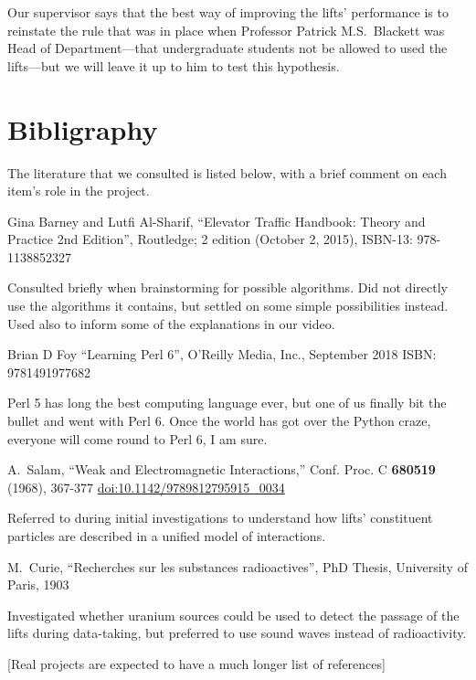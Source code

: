 \documentclass[12pt,a4paper,onecolumn]{Imperial_lab_report}
\begin{document}
Our supervisor says that the best way of improving the lifts' performance is to reinstate the rule that was in place when Professor Patrick M.S.~Blackett was Head of Department—that undergraduate students not be allowed to used the lifts—but we will leave it up to him to test this hypothesis.

\section{Bibligraphy} 
The literature that we consulted is listed below, with a brief comment on each item's role in the project.
\begin{thebibliography}{}

	Gina Barney and Lutfi Al-Sharif, ``Elevator Traffic Handbook: Theory and Practice 2nd Edition'',  Routledge; 2 edition (October 2, 2015), ISBN-13: 978-1138852327

Consulted briefly when brainstorming for possible algorithms. Did not directly use the algorithms it contains, but settled on some simple possibilities instead. Used also to inform some of the explanations in our video.

  Brian D Foy ``Learning Perl 6'', O'Reilly Media, Inc., September 2018 ISBN: 9781491977682

Perl 5 has long the best computing language ever, but one of us finally bit the bullet and went with Perl 6. Once the world has got over the Python craze, everyone will come round to Perl 6, I am sure.

  A.~Salam, ``Weak and Electromagnetic Interactions,'' Conf. Proc. C \textbf{680519} (1968), 367-377 \url{doi:10.1142/9789812795915_0034}

Referred to during initial investigations to understand how lifts' constituent particles are described in a unified model of interactions.

  M.~Curie, ``Recherches sur les substances radioactives'', PhD Thesis, University of Paris, 1903

Investigated whether uranium sources could be used to detect the passage of the lifts during data-taking, but preferred to use sound waves instead of radioactivity.

\vspace*{0.25in} [Real projects are expected to have a much longer list of references]



\end{thebibliography}
\end{document}

